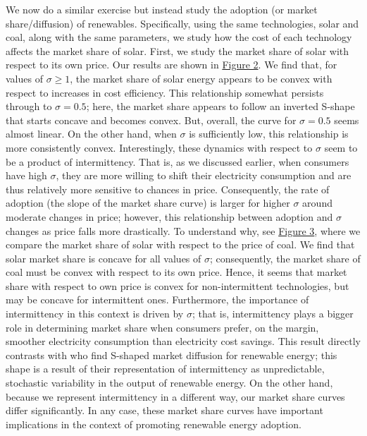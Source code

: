 \documentclass[11pt,a4paper]{extarticle}
\begin{document}
 
We now do a similar exercise but instead study the adoption (or market share/diffusion) of renewables. Specifically, using the same technologies, solar and coal, along with the same parameters, we study how the cost of each technology affects the market share of solar. First, we study the market share of solar with respect to its own price. Our results are shown in \hyperref[fig:adoptc2]{Figure 2}. We find that, for values of $\sigma \geq 1$, the market share of solar energy appears to be convex with respect to increases in cost efficiency. This relationship somewhat persists through to $\sigma = 0.5$; here, the market share appears to follow an inverted S-shape that starts concave and becomes convex. But, overall, the curve for $\sigma = 0.5$ seems almost linear. On the other hand, when $\sigma$ is sufficiently low, this relationship is more consistently convex. Interestingly, these dynamics with respect to $\sigma$ seem to be a product of intermittency. That is, as we discussed earlier, when consumers have high $\sigma$, they are more willing to shift their electricity consumption and are thus relatively more sensitive to chances in price. Consequently, the rate of adoption (the slope of the market share curve) is larger for higher $\sigma$ around moderate changes in price; however, this relationship between adoption and $\sigma$ changes as price falls more drastically. To understand why, see \hyperref[fig:adoptc1]{Figure 3}, where we compare the market share of solar with respect to the price of coal. We find that solar market share is concave for all values of $\sigma$; consequently, the market share of coal must be convex with respect to its own price. Hence, it seems that market share with respect to own price is convex for non-intermittent technologies, but may be concave for intermittent ones. Furthermore, the importance of intermittency in this context is driven by $\sigma$; that is, intermittency plays a bigger role in determining market share when consumers prefer, on the margin, smoother electricity consumption than electricity cost savings. This result directly contrasts with \cite{HH} who find S-shaped market diffusion for renewable energy; this shape is a result of their representation of intermittency as unpredictable, stochastic variability in the output of renewable energy. On the other hand, because we represent intermittency in a different way, our market share curves differ significantly. In any case, these market share curves have important implications in the context of promoting renewable energy adoption. 
\end{document}
